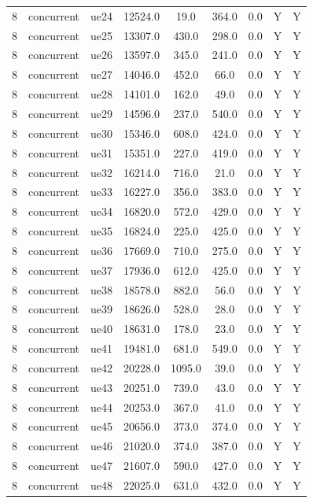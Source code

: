 \begin{table}[ht]
\begin{tabular}{|c|c|c|c|c|c|c|c|c|}
8 & concurrent & ue24 & 12524.0 & 19.0 & 364.0 & 0.0 & Y & Y \\
8 & concurrent & ue25 & 13307.0 & 430.0 & 298.0 & 0.0 & Y & Y \\
8 & concurrent & ue26 & 13597.0 & 345.0 & 241.0 & 0.0 & Y & Y \\
8 & concurrent & ue27 & 14046.0 & 452.0 & 66.0 & 0.0 & Y & Y \\
8 & concurrent & ue28 & 14101.0 & 162.0 & 49.0 & 0.0 & Y & Y \\
8 & concurrent & ue29 & 14596.0 & 237.0 & 540.0 & 0.0 & Y & Y \\
8 & concurrent & ue30 & 15346.0 & 608.0 & 424.0 & 0.0 & Y & Y \\
8 & concurrent & ue31 & 15351.0 & 227.0 & 419.0 & 0.0 & Y & Y \\
8 & concurrent & ue32 & 16214.0 & 716.0 & 21.0 & 0.0 & Y & Y \\
8 & concurrent & ue33 & 16227.0 & 356.0 & 383.0 & 0.0 & Y & Y \\
8 & concurrent & ue34 & 16820.0 & 572.0 & 429.0 & 0.0 & Y & Y \\
8 & concurrent & ue35 & 16824.0 & 225.0 & 425.0 & 0.0 & Y & Y \\
8 & concurrent & ue36 & 17669.0 & 710.0 & 275.0 & 0.0 & Y & Y \\
8 & concurrent & ue37 & 17936.0 & 612.0 & 425.0 & 0.0 & Y & Y \\
8 & concurrent & ue38 & 18578.0 & 882.0 & 56.0 & 0.0 & Y & Y \\
8 & concurrent & ue39 & 18626.0 & 528.0 & 28.0 & 0.0 & Y & Y \\
8 & concurrent & ue40 & 18631.0 & 178.0 & 23.0 & 0.0 & Y & Y \\
8 & concurrent & ue41 & 19481.0 & 681.0 & 549.0 & 0.0 & Y & Y \\
8 & concurrent & ue42 & 20228.0 & 1095.0 & 39.0 & 0.0 & Y & Y \\
8 & concurrent & ue43 & 20251.0 & 739.0 & 43.0 & 0.0 & Y & Y \\
8 & concurrent & ue44 & 20253.0 & 367.0 & 41.0 & 0.0 & Y & Y \\
8 & concurrent & ue45 & 20656.0 & 373.0 & 374.0 & 0.0 & Y & Y \\
8 & concurrent & ue46 & 21020.0 & 374.0 & 387.0 & 0.0 & Y & Y \\
8 & concurrent & ue47 & 21607.0 & 590.0 & 427.0 & 0.0 & Y & Y \\
8 & concurrent & ue48 & 22025.0 & 631.0 & 432.0 & 0.0 & Y & Y \\

\end{tabular}
\end{table}
